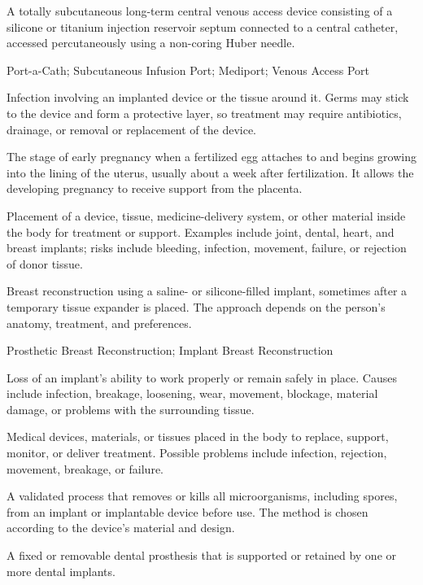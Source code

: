  A totally subcutaneous long-term central venous access device consisting of a silicone or titanium injection reservoir septum connected to a central catheter, accessed percutaneously using a non-coring Huber needle.

\synonyms
Port-a-Cath; Subcutaneous Infusion Port; Mediport; Venous Access Port

 Infection involving an implanted device or the tissue around it. Germs may stick to the device and form a protective layer, so treatment may require antibiotics, drainage, or removal or replacement of the device.

 The stage of early pregnancy when a fertilized egg attaches to and begins growing into the lining of the uterus, usually about a week after fertilization. It allows the developing pregnancy to receive support from the placenta.

 Placement of a device, tissue, medicine-delivery system, or other material inside the body for treatment or support. Examples include joint, dental, heart, and breast implants; risks include bleeding, infection, movement, failure, or rejection of donor tissue.

 Breast reconstruction using a saline- or silicone-filled implant, sometimes after a temporary tissue expander is placed. The approach depends on the person's anatomy, treatment, and preferences.

\synonyms
Prosthetic Breast Reconstruction; Implant Breast Reconstruction

 Loss of an implant’s ability to work properly or remain safely in place. Causes include infection, breakage, loosening, wear, movement, blockage, material damage, or problems with the surrounding tissue.

 Medical devices, materials, or tissues placed in the body to replace, support, monitor, or deliver treatment. Possible problems include infection, rejection, movement, breakage, or failure.

 A validated process that removes or kills all microorganisms, including spores, from an implant or implantable device before use. The method is chosen according to the device’s material and design.

 A fixed or removable dental prosthesis that is supported or retained by one or more dental implants.

